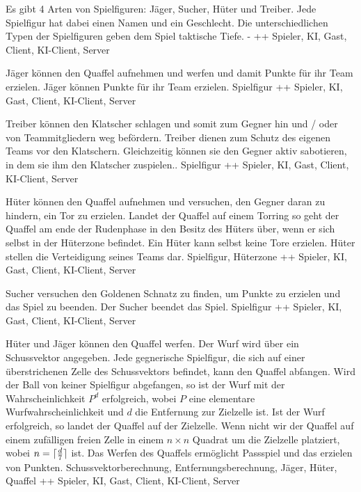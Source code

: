         {Es gibt 4 Arten von Spielfiguren: Jäger, Sucher, Hüter und Treiber. Jede Spielfigur hat dabei einen Namen und ein Geschlecht.}
        {Die unterschiedlichen Typen der Spielfiguren geben dem Spiel taktische Tiefe.}
        {-}
        {++}
        {Spieler, KI, Gast, Client, KI-Client, Server}

        {Jäger können den Quaffel aufnehmen und werfen und damit Punkte für ihr Team erzielen.}
        {Jäger können Punkte für ihr Team erzielen.}
        {Spielfigur}
        {++}
        {Spieler, KI, Gast, Client, KI-Client, Server}

        {Treiber können den Klatscher schlagen und somit zum Gegner hin und / oder von Teammitgliedern weg befördern.}
        {Treiber dienen zum Schutz des eigenen Teams vor den Klatschern. Gleichzeitig können sie den Gegner aktiv sabotieren, in dem sie ihm den Klatscher zuspielen..}
        {Spielfigur}
        {++}
        {Spieler, KI, Gast, Client, KI-Client, Server}

        {Hüter können den Quaffel aufnehmen und versuchen, den Gegner daran zu hindern, ein Tor zu erzielen. Landet der Quaffel auf einem Torring so geht der Quaffel am ende der Rudenphase in den Besitz des Hüters über, wenn er sich selbst in der Hüterzone befindet. Ein Hüter kann selbst keine Tore erzielen.}
        {Hüter stellen die Verteidigung seines Teams dar.}
        {Spielfigur, Hüterzone}
        {++}
        {Spieler, KI, Gast, Client, KI-Client, Server}

        {Sucher versuchen den Goldenen Schnatz zu finden, um Punkte zu erzielen und das Spiel zu beenden.}
        {Der Sucher beendet das Spiel.}
        {Spielfigur}
        {++}
        {Spieler, KI, Gast, Client, KI-Client, Server}
        
        {Hüter und Jäger können den Quaffel werfen. Der Wurf wird über ein Schussvektor angegeben. Jede gegnerische Spielfigur, die sich auf einer überstrichenen Zelle des Schussvektors befindet, kann den Quaffel abfangen. Wird der Ball von keiner Spielfigur abgefangen, so ist der Wurf mit der Wahrscheinlichkeit $P^d$ erfolgreich, wobei $P$ eine elementare Wurfwahrscheinlichkeit und $d$ die Entfernung zur Zielzelle ist. Ist der Wurf erfolgreich, so landet der Quaffel auf der Zielzelle. Wenn nicht wir der Quaffel auf einem zufälligen freien Zelle in einem $n\times n$ Quadrat um die Zielzelle platziert, wobei $n=\lceil \frac{d}{7}\rceil$ ist.}			
        {Das Werfen des Quaffels ermöglicht Passspiel und das erzielen von Punkten.}
        {Schussvektorberechnung, Entfernungsberechnung, Jäger, Hüter, Quaffel}
        {++}
        {Spieler, KI, Gast, Client, KI-Client, Server}
        
